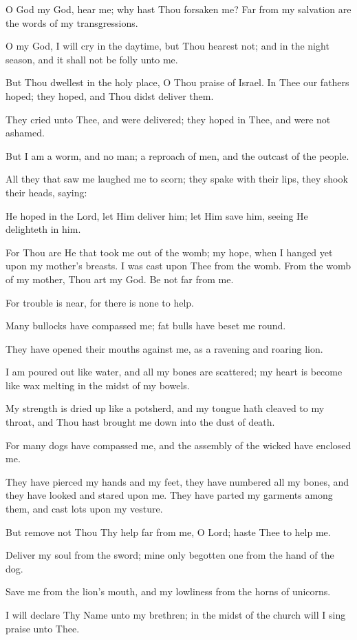 O God my God, hear me; why hast Thou forsaken me? Far from my salvation are the words of my transgressions.

O my God, I will cry in the daytime, but Thou hearest not; and in the night season, and it shall not be folly unto me.

But Thou dwellest in the holy place, O Thou praise of Israel. In Thee our fathers hoped; they hoped, and Thou didst deliver them.

They cried unto Thee, and were delivered; they hoped in Thee, and were not ashamed.

But I am a worm, and no man; a reproach of men, and the outcast of the people.

All they that saw me laughed me to scorn; they spake with their lips, they shook their heads, saying:

He hoped in the Lord, let Him deliver him; let Him save him, seeing He delighteth in him.

For Thou are He that took me out of the womb; my hope, when I hanged yet upon my mother's breasts. I was cast upon Thee from the womb. From the womb of my mother, Thou art my God. Be not far from me.

For trouble is near, for there is none to help.

Many bullocks have compassed me; fat bulls have beset me round.

They have opened their mouths against me, as a ravening and roaring lion.

I am poured out like water, and all my bones are scattered; my heart is become like wax melting in the midst of my bowels.

My strength is dried up like a potsherd, and my tongue hath cleaved to my throat, and Thou hast brought me down into the dust of death.

For many dogs have compassed me, and the assembly of the wicked have enclosed me.

They have pierced my hands and my feet, they have numbered all my bones, and they have looked and stared upon me. They have parted my garments among them, and cast lots upon my vesture.

But remove not Thou Thy help far from me, O Lord; haste Thee to help me.

Deliver my soul from the sword; mine only begotten one from the hand of the dog.

Save me from the lion's mouth, and my lowliness from the horns of unicorns.

I will declare Thy Name unto my brethren; in the midst of the church will I sing praise unto Thee.

